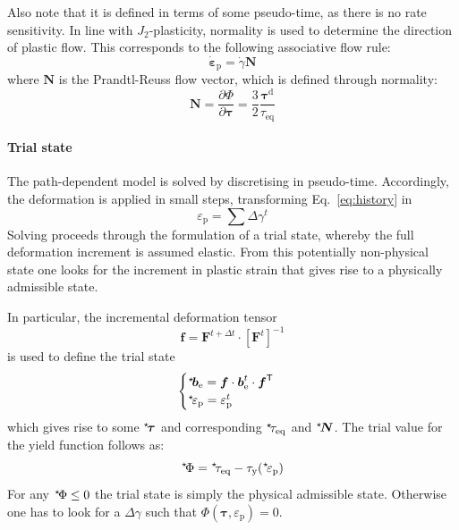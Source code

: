 \documentclass{goose-article}
\newcommand\ST[1]{\hspace*{-.3em}~^\star\!#1}
\newcommand\T[1]{\bm{{#1}}}
\begin{document}
Also note that it is defined in terms of some pseudo-time, as there is no rate sensitivity.
In line with $J_2$-plasticity, normality is used to determine the direction of plastic flow.
This corresponds to the following associative flow rule:
\begin{equation}
    \dot{\bm{\varepsilon}}_\mathrm{p} = \dot{\gamma} \bm{N}
    \label{eq:flow-rule}
\end{equation}
where $\bm{N}$ is the Prandtl-Reuss flow vector, which is defined through normality:
\begin{equation}
    \bm{N}
    = \frac{\partial \Phi}{\partial \T{\tau}}
    = \frac{3}{2} \frac{\T{\tau}^\mathrm{d}}{\tau_\mathrm{eq}}
\end{equation}

\paragraph{Trial state}

The path-dependent model is solved by discretising in pseudo-time.
Accordingly, the deformation is applied in small steps, transforming Eq.~\eqref{eq:history} in
\begin{equation}
    \varepsilon_\mathrm{p} = \sum \Delta \gamma^t
\end{equation}
Solving proceeds through the formulation of a trial state,
whereby the full deformation increment is assumed elastic.
From this potentially non-physical state one looks for the increment in plastic strain
that gives rise to a physically admissible state.

In particular, the incremental deformation tensor
\begin{equation}
    \T{f} = \T{F}^{t + \Delta t} \cdot \left[ \T{F}^t \right]^{-1}
\end{equation}
is used to define the trial state
\begin{equation}
    \begin{cases}
        \ST{\T{b}}_\mathrm{e} = \T{f} \cdot \T{b}_\mathrm{e}^t \cdot \T{f}^\mathsf{T}
        \\
        \ST{\varepsilon_\mathrm{p}} = \varepsilon_\mathrm{p}^t
    \end{cases}
\end{equation}
which gives rise to some $\ST{\T{\tau}}$ and corresponding $\ST{\tau}_\mathrm{eq}$ and $\ST{\T{N}}$.
The trial value for the yield function follows as:
\begin{equation}
  \ST{\Phi} = \ST{\tau}_\mathrm{eq} - \tau_\mathrm{y}(\ST{\varepsilon}_\mathrm{p})
\end{equation}
For any $\ST{\Phi} \leq 0$ the trial state is simply the physical admissible state.
Otherwise one has to look for a $\Delta \gamma$ such that
$\Phi(\T{\tau},\varepsilon_\mathrm{p}) = 0$.
\end{document}
